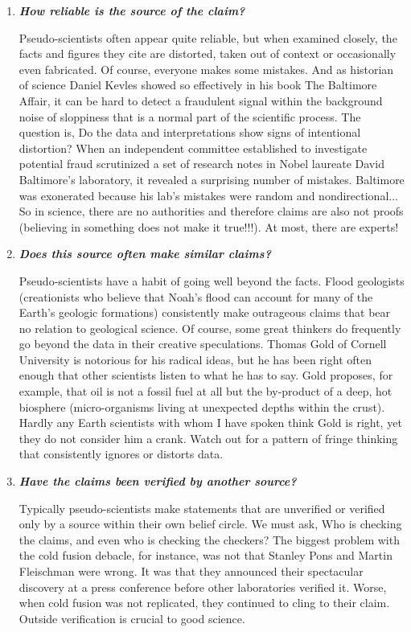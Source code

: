 	\begin{enumerate}[label=\protect\circledbullet{\arabic*},leftmargin=15mm]
		\item \textit{\textbf{How reliable is the source of the claim?}}

		Pseudo-scientists often appear quite reliable, but when examined closely, the facts and figures they cite are distorted, taken out of context or occasionally even fabricated. Of course, everyone makes some mistakes. And as historian of science Daniel Kevles showed so effectively in his book The Baltimore Affair, it can be hard to detect a fraudulent signal within the background noise of sloppiness that is a normal part of the scientific process. The question is, Do the data and interpretations show signs of intentional distortion? When an independent committee established to investigate potential fraud scrutinized a set of research notes in Nobel laureate David Baltimore's laboratory, it revealed a surprising number of mistakes. Baltimore was exonerated because his lab's mistakes were random and nondirectional... So in science, there are no authorities and therefore claims are also not proofs (believing in something does not make it true!!!). At most, there are experts!

		\item \textit{\textbf{Does this source often make similar claims?}}

		Pseudo-scientists have a habit of going well beyond the facts. Flood geologists (creationists who believe that Noah's flood can account for many of the Earth's geologic formations) consistently make outrageous claims that bear no relation to geological science. Of course, some great thinkers do frequently go beyond the data in their creative speculations. Thomas Gold of Cornell University is notorious for his radical ideas, but he has been right often enough that other scientists listen to what he has to say. Gold proposes, for example, that oil is not a fossil fuel at all but the by-product of a deep, hot biosphere (micro-organisms living at unexpected depths within the crust). Hardly any Earth scientists with whom I have spoken think Gold is right, yet they do not consider him a crank. Watch out for a pattern of fringe thinking that consistently ignores or distorts data.

		\item \textit{\textbf{Have the claims been verified by another source?}}

		Typically pseudo-scientists make statements that are unverified or verified only by a source within their own belief circle. We must ask, Who is checking the claims, and even who is checking the checkers? The biggest problem with the cold fusion debacle, for instance, was not that Stanley Pons and Martin Fleischman were wrong. It was that they announced their  spectacular discovery at a press conference before other laboratories verified it. Worse, when cold fusion was not replicated, they continued to cling to their claim. Outside verification is crucial to good science.


\end{enumerate}
